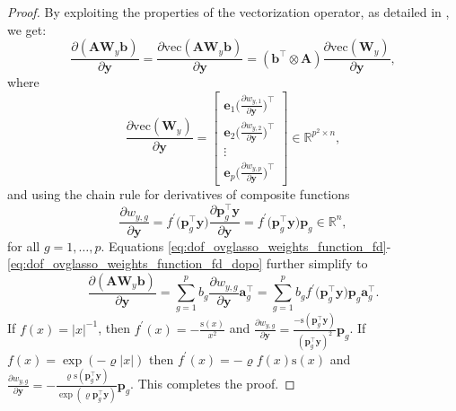 \documentclass[a4paper, 12pt]{article}
\newcommand{\sgn}{\mathrm{s}}
\newcommand{\vecof}{\mathrm{vec}}
\newcommand{\T}{\top}
\def\ba{\boldsymbol{a}}
\def\bb{\boldsymbol{b}}
\def\be{\boldsymbol{e}}
\def\bp{\boldsymbol{p}}
\def\by{\boldsymbol{y}}
\def\bA{\mathbf{A}}
\def\bW{\mathbf{W}}
\def\ba{\mathbf{a}}
\def\bb{\mathbf{b}}
\def\be{\mathbf{e}}
\def\bp{\mathbf{p}}
\def\by{\mathbf{y}}
\begin{document}
\begin{proof}
%
By exploiting the properties of the vectorization operator, as detailed in \cite{magnus_neudecker.1999}, we get:
\begin{equation*}
\label{eq:dof_ovglasso_weights_function_fd_prima}
\frac{\partial(\bA\bW_y\bb)}{\partial\by}=\frac{\partial\vecof(\bA\bW_y\bb)}{\partial\by}=(\bb^{\T}\otimes\bA)\frac{\partial\vecof(\bW_y)}{\partial\by},
\end{equation*}
where
\begin{equation}
\label{eq:dof_ovglasso_weights_function_fd}
\frac{\partial\vecof(\bW_y)}{\partial\by}=
\begin{bmatrix}
\be_1  \big(\frac{\partial w_{y,1}}{\partial \by}\big)^{\T}\\
\be_2 \big(\frac{\partial w_{y,2}}{\partial \by}\big)^{\T}\\
\vdots\\
\be_p  \big(\frac{\partial w_{y,p}}{\partial \by}\big)^{\T}
\end{bmatrix}\in\mathbb{R}^{p^2\times n},
\end{equation}
and using the chain rule for derivatives of composite functions
\begin{equation}
\label{eq:dof_ovglasso_weights_function_fd_dopo}
\frac{\partial w_{y,g}}{\partial \by}=f^\prime\big(\bp_g^{\T}\by\big)\frac{\partial \bp_g^{\T}\by}{\partial \by}=f^\prime\big(\bp_g^{\T}\by\big) \bp_g\in\mathbb{R}^n,
\end{equation}
for all $g=1,\dots,p$. Equations \eqref{eq:dof_ovglasso_weights_function_fd}-\eqref{eq:dof_ovglasso_weights_function_fd_dopo} further simplify to
\begin{equation*}
\frac{\partial(\bA\bW_y\bb)}{\partial\by}=\sum_{g=1}^p b_g \frac{\partial w_{y,g}}{\partial\by}  \ba_g^{{\T}}
%
=\sum_{g=1}^p b_g f^\prime\big(\bp_g^{\T}\by\big) \bp_g\ba_g^{{\T}}.
\end{equation*}
%
If $f(x)=\vert x\vert^{-1}$, then $f^\prime(x)=-\frac{\sgn(x)}{x^{2}}$ and $\frac{\partial w_{y,g}}{\partial \by}=\frac{-\sgn(\bp_g^{\T}\by)}{(\bp_g^{\T}\by)^2}\bp_g$. If $f(x)=\exp{(-\varrho\vert x\vert)}$ then $f^\prime(x)=-\varrho f(x)\sgn(x)$ and $\frac{\partial w_{y,g}}{\partial \by}=-\frac{\varrho\sgn(\bp_g^{\T}\by)}{\exp{(\varrho\bp_g^{\T}\by)}}\bp_g$. This completes the proof.
\end{proof}
\end{document}
